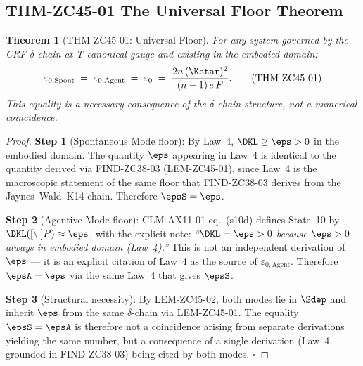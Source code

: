 \documentclass[12pt, a4paper]{article}
\newtheorem{theorem}{Theorem}[section]
\begin{document}
\subsection{THM-ZC45-01 \quad The Universal Floor Theorem}


\begin{formalbox}[title={THM-ZC45-01: Universal Floor ---
  $\varepsilon_{0,\mathrm{Spont}} = \varepsilon_{0,\mathrm{Agent}}
  = \varepsilon_0$ (Theorem)}]

\begin{theorem}[THM-ZC45-01: Universal Floor]
\label{thm:zc45-01}
For any system governed by the CRF $\delta$-chain at
T-canonical gauge and existing in the embodied domain:
\begin{equation}
  \varepsilon_{0,\mathrm{Spont}}
  \;=\;
  \varepsilon_{0,\mathrm{Agent}}
  \;=\;
  \varepsilon_0
  \;=\;
  \frac{2n\,(\Kstar)^2}{(n-1)\,e\,F}.
  \tag{THM-ZC45-01}\label{eq:universal-floor}
\end{equation}
This equality is a \emph{necessary consequence} of the
$\delta$-chain structure, not a numerical coincidence.
\end{theorem}

\begin{proof}
\textbf{Step 1} (Spontaneous Mode floor):
By Law~4, $\DKL \geq \eps > 0$ in the embodied domain.
The quantity $\eps$ appearing in Law~4 is identical to the
quantity derived via FIND-ZC38-03 (LEM-ZC45-01), since
Law~4 is the macroscopic statement of the same floor that
FIND-ZC38-03 derives from the Jaynes--Wald--K14 chain.
Therefore $\epsS = \eps$.

\medskip
\textbf{Step 2} (Agentive Mode floor):
CLM-AX11-01 eq.~(s10d) defines State~10 by
$\DKL(\Cref\|P) \approx \eps$, with the explicit note:
\textit{``$\DKL = \eps > 0$ because $\eps > 0$ always in
embodied domain (Law~4).''}
This is not an independent derivation of $\eps$ --- it is an
explicit citation of Law~4 as the source of $\varepsilon_{0,\mathrm{Agent}}$.
Therefore $\epsA = \eps$ via the same Law~4 that gives $\epsS$.

\medskip
\textbf{Step 3} (Structural necessity):
By LEM-ZC45-02, both modes lie in $\Sdep$ and inherit $\eps$
from the same $\delta$-chain via LEM-ZC45-01.
The equality $\epsS = \epsA$ is therefore not a coincidence
arising from separate derivations yielding the same number,
but a consequence of a single derivation (Law~4, grounded in
FIND-ZC38-03) being cited by both modes.
\hfill$\square$
\end{proof}


\end{formalbox}
\end{document}
